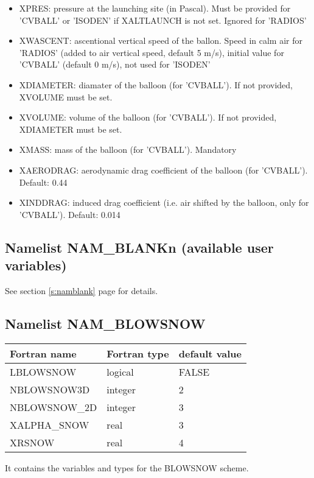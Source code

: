 \begin{itemize}
\item XPRES: pressure at the launching site (in Pascal). Must be provided for 'CVBALL' or 'ISODEN' if XALTLAUNCH is not set. Ignored for 'RADIOS'

\item XWASCENT: ascentional vertical speed of the ballon. Speed in calm air for 'RADIOS' (added to air vertical speed, default 5 m/s), initial value for 'CVBALL' (default 0 m/s), not used for 'ISODEN'

\item XDIAMETER: diamater of the balloon (for 'CVBALL'). If not provided, XVOLUME must be set.

\item XVOLUME: volume of the balloon (for 'CVBALL'). If not provided, XDIAMETER must be set.

\item XMASS: mass of the balloon (for 'CVBALL'). Mandatory

\item XAERODRAG: aerodynamic drag coefficient of the balloon (for 'CVBALL'). Default: 0.44

\item XINDDRAG: induced drag coefficient (i.e. air shifted by the balloon, only for 'CVBALL'). Default: 0.014

\end{itemize}


\subsection{Namelist NAM\_BLANKn (available user variables)}
See section \ref{s:namblank} page \pageref{s:namblank} for details.

\subsection{Namelist NAM\_BLOWSNOW }

\begin{center}
\begin{tabular} {|l|l|l|}
\hline
Fortran name & Fortran type & default value \\
\hline

LBLOWSNOW    & logical & FALSE     \\
NBLOWSNOW3D  & integer & 2         \\
NBLOWSNOW\_2D& integer & 3       \\
XALPHA\_SNOW & real    &3 \\
XRSNOW       & real    & 4\\
\hline
\end{tabular}
\end{center}
It contains the variables and types for the BLOWSNOW scheme.

